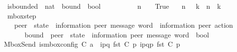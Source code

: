 \begin{isabellebody}
\isanewline
{}\isamarkupfalse%
\ is{\isacharunderscore}{\kern0pt}bounded\ {\isacharcolon}{\kern0pt}{\isacharcolon}{\kern0pt}\ {\isachardoublequoteopen}nat\ {\isasymRightarrow}\ bound\ {\isasymRightarrow}\ bool{\isachardoublequoteclose}\ \ {\isacharparenleft}{\kern0pt}{\isachardoublequoteopen}{\isacharunderscore}{\kern0pt}\ {\isacharless}{\kern0pt}\isactrlsub {\isasymB}\ {\isacharunderscore}{\kern0pt}{\isachardoublequoteclose}\ {\isacharbrackleft}{\kern0pt}{}{}{\isacharcomma}{\kern0pt}\ {}{}{\isacharbrackright}{\kern0pt}\ {}{}{}{\isacharparenright}{\kern0pt}\ \isanewline
\ \ {\isachardoublequoteopen}n\ {\isacharless}{\kern0pt}\isactrlsub {\isasymB}\ {\isasyminfinity}\ {\isacharequal}{\kern0pt}\ True{\isachardoublequoteclose}\ {\isacharbar}{\kern0pt}\isanewline
\ \ {\isachardoublequoteopen}n\ {\isacharless}{\kern0pt}\isactrlsub {\isasymB}\ {\isasymB}\ k\ {\isacharequal}{\kern0pt}\ {\isacharparenleft}{\kern0pt}n\ {\isacharless}{\kern0pt}\ k{\isacharparenright}{\kern0pt}{\isachardoublequoteclose}\isanewline
\isanewline
{}\isamarkupfalse%
\ mbox{\isacharunderscore}{\kern0pt}step\isanewline
\ \ {\isacharcolon}{\kern0pt}{\isacharcolon}{\kern0pt}\ {\isachardoublequoteopen}{\isacharparenleft}{\kern0pt}{\isacharprime}{\kern0pt}peer\ {\isasymRightarrow}\ {\isacharparenleft}{\kern0pt}{\isacharprime}{\kern0pt}state\ {\isasymtimes}\ {\isacharparenleft}{\kern0pt}{\isacharprime}{\kern0pt}information{\isacharcomma}{\kern0pt}\ {\isacharprime}{\kern0pt}peer{\isacharparenright}{\kern0pt}\ message\ word{\isacharparenright}{\kern0pt}{\isacharparenright}{\kern0pt}\ {\isasymRightarrow}\ {\isacharparenleft}{\kern0pt}{\isacharprime}{\kern0pt}information{\isacharcomma}{\kern0pt}\ {\isacharprime}{\kern0pt}peer{\isacharparenright}{\kern0pt}\ action\ {\isasymRightarrow}\isanewline
\ \ \ \ \ \ bound\ {\isasymRightarrow}\ {\isacharparenleft}{\kern0pt}{\isacharprime}{\kern0pt}peer\ {\isasymRightarrow}\ {\isacharparenleft}{\kern0pt}{\isacharprime}{\kern0pt}state\ {\isasymtimes}\ {\isacharparenleft}{\kern0pt}{\isacharprime}{\kern0pt}information{\isacharcomma}{\kern0pt}\ {\isacharprime}{\kern0pt}peer{\isacharparenright}{\kern0pt}\ message\ word{\isacharparenright}{\kern0pt}{\isacharparenright}{\kern0pt}\ {\isasymRightarrow}\ bool{\isachardoublequoteclose}\ \isanewline
MboxSend{\isacharcolon}{\kern0pt}\ {\isachardoublequoteopen}{\isasymlbrakk}is{\isacharunderscore}{\kern0pt}mbox{\isacharunderscore}{\kern0pt}config\ C{}{\isacharsemicolon}{\kern0pt}\ a\ {\isacharequal}{\kern0pt}\ {\isacharbang}{\kern0pt}{\isasymlangle}{\isacharparenleft}{\kern0pt}i\isactrlbsup p{\isasymrightarrow}q\isactrlesup {\isacharparenright}{\kern0pt}{\isasymrangle}{\isacharsemicolon}{\kern0pt}\ fst\ {\isacharparenleft}{\kern0pt}C{}\ p{\isacharparenright}{\kern0pt}\ {\isasymmidarrow}{\isacharbang}{\kern0pt}{\isasymlangle}{\isacharparenleft}{\kern0pt}i\isactrlbsup p{\isasymrightarrow}q\isactrlesup {\isacharparenright}{\kern0pt}{\isasymrangle}{\isasymrightarrow}p\ {\isacharparenleft}{\kern0pt}fst\ {\isacharparenleft}{\kern0pt}C{}\ p{\isacharparenright}{\kern0pt}{\isacharparenright}{\kern0pt}{\isacharsemicolon}{\kern0pt}\isanewline

\end{isabellebody}
